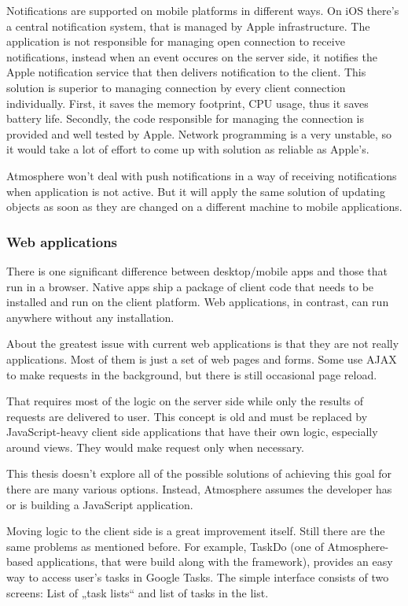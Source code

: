 Notifications are supported on mobile platforms in different ways. On iOS there’s a central notification system, that is managed by Apple infrastructure. The application is not responsible for managing open connection to receive notifications, instead when an event occures on the server side, it notifies the Apple notification service that then delivers notification to the client. This solution is superior to managing connection by every client connection individually. First, it saves the memory footprint, CPU usage, thus it saves battery life. Secondly, the code responsible for managing the connection is provided and well tested by Apple. Network programming is a very unstable, so it would take a lot of effort to come up with solution as reliable as Apple’s. 

Atmosphere won’t deal with push notifications in a way of receiving notifications when application is not active. But it will apply the same solution of updating objects as soon as they are changed on a different machine to mobile applications. 

\subsubsection{Web applications}

There is one significant difference between desktop/mobile apps and those that run in a browser. Native apps ship a package of client code that needs to be installed and run on the client platform. Web applications, in contrast, can run anywhere without any installation.

About the greatest issue with current web applications is that they are not really applications. Most of them is just a set of web pages and forms. Some use AJAX to make requests in the background, but there is still occasional page reload.

That requires most of the logic on the server side while only the results of requests are delivered to user. This concept is old and must be replaced by JavaScript-heavy client side applications that have their own logic, especially around views. They would make request only when necessary.

This thesis doesn’t explore all of the possible solutions of achieving this goal for there are many various options. Instead, Atmosphere assumes the developer has or is building a JavaScript application.

Moving logic to the client side is a great improvement itself. Still there are the same problems as mentioned before. For example, TaskDo (one of Atmosphere-based applications, that were build along with the framework), provides an easy way to access user’s tasks in Google Tasks. The simple interface consists of two screens: List of „task lists“ and list of tasks in the list.


